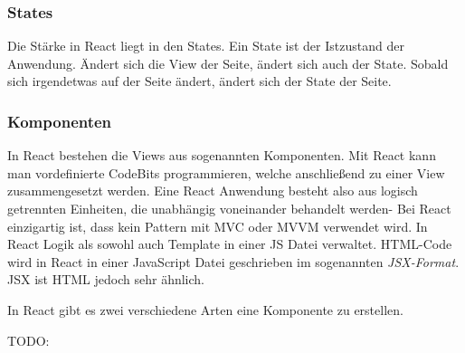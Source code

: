 \subsubsection{States}
Die Stärke in React liegt in den States. Ein State ist der Istzustand der Anwendung. Ändert sich die View der Seite, ändert sich auch der
State. Sobald sich irgendetwas auf der Seite ändert, ändert sich der State der Seite.


\subsubsection{Komponenten}
In React bestehen die Views aus sogenannten Komponenten. Mit React kann man vordefinierte CodeBits programmieren, welche anschließend zu einer
View zusammengesetzt werden. Eine React Anwendung besteht also aus logisch getrennten Einheiten, die unabhängig voneinander behandelt werden-
Bei React einzigartig ist, dass kein Pattern mit MVC oder MVVM verwendet wird. In React Logik als sowohl auch Template in einer JS Datei
verwaltet.
HTML-Code wird in React in einer JavaScript Datei geschrieben im sogenannten \textit{JSX-Format}. JSX ist HTML jedoch sehr ähnlich.


In React gibt es zwei verschiedene Arten eine Komponente zu erstellen.

TODO:

\cite{Komp}
